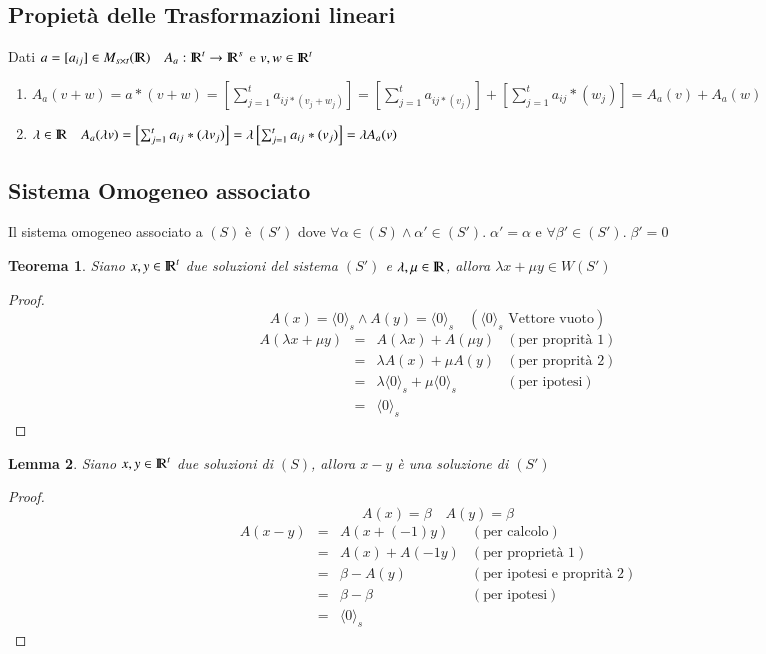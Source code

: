 \documentclass[12pt,a4paper]{article}
\theoremstyle{break}
\newtheorem{theorem}{Teorema}[section]
\newtheorem{lemma}[theorem]{Lemma}
\newcommand\R{{\rm I\!R}}
\begin{document}
    \subsection{Propietà delle Trasformazioni lineari}
    Dati $a = [a_{ij}]\in M_{s\times t}(\R)\quad A_a:\R^t\rightarrow\R^s$ e $v,w\in\R^t$
    \begin{enumerate}
        \item $A_a(v+w) = a*(v+w) = \left[\sum_{j=1}^t a_{ij*(v_j+w_j)}\right] = \left[\sum_{j=1}^t a_{ij*(v_j)}\right] + \left[\sum_{j=1}^t a_{ij}*(w_j)\right] = A_a(v) + A_a(w)$
        \item $\lambda\in\R\quad A_a(\lambda v) = \left[\sum_{j=1}^t a_{ij}*(\lambda v_j)\right] = \lambda\left[\sum_{j=1}^t a_{ij}*(v_j)\right] = \lambda A_a(v)$
    \end{enumerate}
    \newpage
    \subsection{Sistema Omogeneo associato}
    Il sistema omogeneo associato a $(S)$ è $(S')$ dove $\forall \alpha\in (S) \wedge \alpha' \in (S').\;\alpha' = \alpha$ e $\forall \beta'\in (S').\; \beta' = 0$
    \begin{theorem}
        Siano $x,y\in\R^t$ due soluzioni del sistema $(S')$ e $\lambda,\mu\in\R$, allora $\lambda x+\mu y \in W(S')$
    \end{theorem}
    \begin{proof}
        \[A(x) = \langle 0\rangle_s \wedge A(y) = \langle 0 \rangle_s \quad (\langle 0 \rangle_s \text{ Vettore vuoto})\]
        \[
            \begin{matrix}
                A(\lambda x + \mu y) & = & A(\lambda x) + A(\mu y) & (\text{per proprità 1})\\
                & = & \lambda A(x) + \mu A(y) & (\text{per proprità 2})\\
                & = & \lambda \langle 0 \rangle_s + \mu \langle 0 \rangle_s & (\text{per ipotesi})\\
                & = & \langle 0 \rangle_s
            \end{matrix}
        \]
    \end{proof}
    \begin{lemma}
        Siano $x,y\in\R^t$ due soluzioni di $(S)$, allora $x-y$ è una soluzione di $(S')$
    \end{lemma}
    \begin{proof}
        \[A(x) = \beta\quad A(y) = \beta\]
        \[
            \begin{matrix}
                A(x-y) & = & A(x + (-1)y) & (\text{per calcolo}) \\
                & = & A(x) + A(-1y) & (\text{per proprietà 1}) \\
                & = & \beta - A(y) & (\text{per ipotesi e proprità 2}) \\
                & = & \beta - \beta & (\text{per ipotesi}) \\
                & = & \langle 0 \rangle_s
            \end{matrix}
        \]
    \end{proof}
\end{document}
